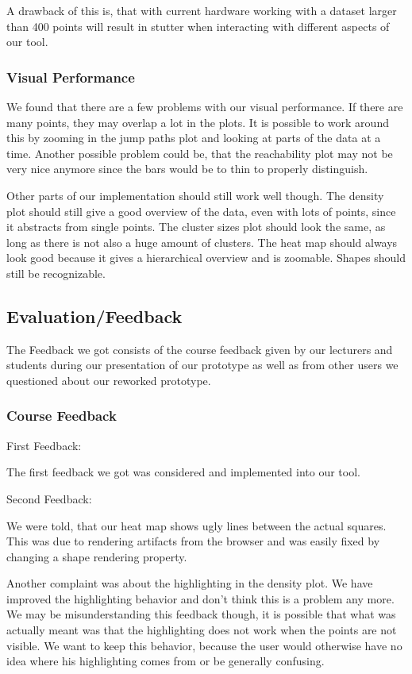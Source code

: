 \documentclass{vgtc} %
\begin{document}
A drawback of this is, that with current hardware working with a dataset larger than 400 points will result in stutter when interacting with different aspects of our tool.

\subsubsection{Visual Performance}
We found that there are a few problems with our visual performance. If there are many points, they may overlap a lot in the plots. It is possible to work around this by zooming in the jump paths plot and looking at parts of the data at a time. Another possible problem could be, that the reachability plot may not be very nice anymore since the bars would be to thin to properly distinguish.

Other parts of our implementation should still work well though. The density plot should still give a good overview of the data, even with lots of points, since it abstracts from single points. The cluster sizes plot should look the same, as long as there is not also a huge amount of clusters. The heat map should always look good because it gives a hierarchical overview and is zoomable. Shapes should still be recognizable.
\subsection{Evaluation/Feedback}
The Feedback we got consists of the course feedback given by our lecturers and students during our presentation of our prototype as well as from other users we questioned about our reworked prototype.
\subsubsection{Course Feedback}

First Feedback:

The first feedback we got was considered and implemented into our tool.

\noindent Second Feedback:

We were told, that our heat map shows ugly lines between the actual squares. This was due to rendering artifacts from the browser and was easily fixed by changing a shape rendering property.

Another complaint was about the highlighting in the density plot. We have improved the highlighting behavior and don't think this is a problem any more. We may be misunderstanding this feedback though, it is possible that what was actually meant was that the highlighting does not work when the points are not visible. We want to keep this behavior, because the user would otherwise have no idea where his highlighting comes from or be generally confusing.
\end{document}
